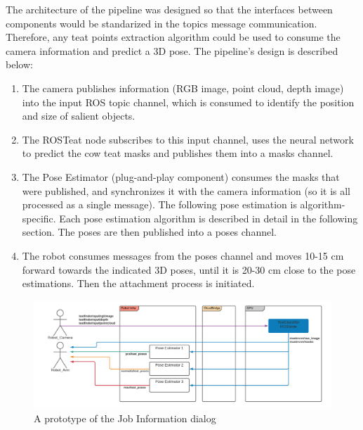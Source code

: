 The architecture of the pipeline was designed so that the interfaces between components would be standarized in the topics message communication. Therefore, any teat points extraction algorithm could be used to consume the camera information and predict a 3D pose. The pipeline's design is described below:
\begin{enumerate}
    \item The camera publishes information (RGB image, point cloud, depth image) into the input ROS topic channel, which is consumed to identify the position and size of salient objects.
    \item The ROSTeat node subscribes to this input channel, uses the neural network to predict the cow teat masks and publishes them into a masks channel.
    \item The Pose Estimator (plug-and-play component) consumes the masks that were published, and synchronizes it with the camera information (so it is all processed as a single message). The following pose estimation is algorithm-specific. Each pose estimation algorithm is described in detail in the following section. The poses are then published into a poses channel.
    \item The robot consumes messages from the poses channel and moves 10-15 cm forward towards the indicated 3D poses, until it is 20-30 cm close to the pose estimations. Then the attachment process is initiated.
\end{enumerate}
\begin{figure}[!ht]
    \centering
    \includegraphics[width=1\textwidth]{images/cow_topics.png}
    \caption{A prototype of the Job Information dialog}
    \label{fig:cow_topics}
\end{figure}


